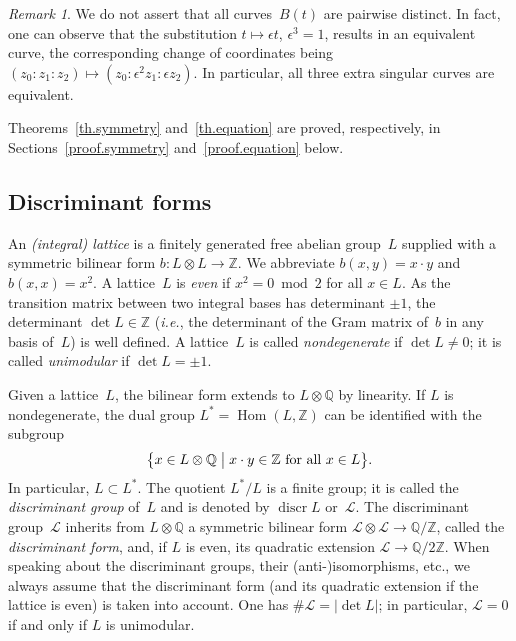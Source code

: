\documentclass{amsart}
\theoremstyle{remark}
\newtheorem{remark}[subsubsection]{Remark}
\numberwithin{equation}{section}
\let\Bbb\mathbb
\let\Cal\mathcal
\let\curve=B
\let\Ge\epsilon
\begin{document}
\begin{remark}\label{rem.triple}
We do not assert that all curves~$\curve(t)$
are
pairwise distinct. In fact, one can observe that the substitution
$t\mapsto\Ge t$, $\Ge^3=1$, results in an equivalent
curve, the corresponding change of coordinates being
$(z_0:z_1:z_2)\mapsto(z_0:\Ge^2z_1:\Ge z_2)$. In particular, all
three extra singular curves are equivalent.
\end{remark}

Theorems~\ref{th.symmetry} and~\ref{th.equation} are proved,
respectively,
in Sections~\ref{proof.symmetry} and~\ref{proof.equation} below.

\subsection{Discriminant forms}\label{s.discr}
An \emph{{\/{\rm (}}integral{\/{\rm )}} lattice} is a finitely generated free
abelian group~$L$ supplied with a symmetric bilinear form $b\colon
L\otimes L\to{\Bbb Z}$. We abbreviate $b(x,y)=x\cdot y$ and
$b(x,x)=x^2$. A lattice~$L$ is \emph{even} if $x^2=0\bmod2$ for
all $x\in L$. As the transition matrix between two integral bases
has determinant $\pm1$, the determinant $\det L\in{\Bbb Z}$ ({\emph{i.e.}}, the
determinant of the Gram matrix of~$b$ in any basis of~$L$) is well
defined. A lattice~$L$ is called \emph{nondegenerate} if $\det
L\ne0$; it is called \emph{unimodular} if $\det L=\pm1$.

Given a lattice~$L$,
the bilinear form extends to $L\otimes{\Bbb Q}$ by linearity. If
$L$ is nondegenerate, the dual group $L^*={\operatorname{Hom}}(L,{\Bbb Z})$ can
be identified with the subgroup
$$
\bigl\{x\in L\otimes{\Bbb Q}\bigm|
 \text{$x\cdot y\in{\Bbb Z}$ for all $x\in L$}\bigr\}.
$$
In particular, $L\subset L^*$. The quotient $L^*/L$ is a finite
group; it is called the \emph{discriminant group} of~$L$ and is
denoted by ${\operatorname{discr}} L$ or~${\Cal L}$. The discriminant group~${\Cal L}$
inherits from $L\otimes{\Bbb Q}$ a symmetric bilinear form
${\Cal L}\otimes{\Cal L}\to{\Bbb Q}/{\Bbb Z}$, called the \emph{discriminant form}, and,
if $L$ is even, its quadratic extension ${\Cal L}\to{\Bbb Q}/2{\Bbb Z}$. When
speaking about the discriminant groups, their (anti-)isomorphisms,
etc., we always assume that the discriminant form (and its
quadratic extension if the lattice is even) is taken into account.
One has $\#{\Cal L}=\mathopen|\det L\mathclose|$; in particular,
${\Cal L}=0$ if and only if $L$ is unimodular.
\end{document}
